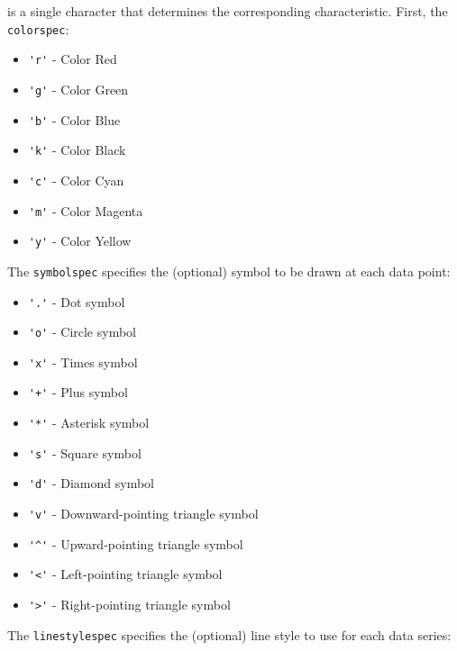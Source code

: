 is a single character that determines the corresponding characteristic.  First, the 
\verb|colorspec|:
\begin{itemize}
\item  \verb|'r'| - Color Red

\item  \verb|'g'| - Color Green

\item  \verb|'b'| - Color Blue

\item  \verb|'k'| - Color Black

\item  \verb|'c'| - Color Cyan

\item  \verb|'m'| - Color Magenta

\item  \verb|'y'| - Color Yellow

\end{itemize}
The \verb|symbolspec| specifies the (optional) symbol to be drawn at each data point:
\begin{itemize}
\item  \verb|'.'| - Dot symbol

\item  \verb|'o'| - Circle symbol

\item  \verb|'x'| - Times symbol

\item  \verb|'+'| - Plus symbol

\item  \verb|'*'| - Asterisk symbol

\item  \verb|'s'| - Square symbol

\item  \verb|'d'| - Diamond symbol

\item  \verb|'v'| - Downward-pointing triangle symbol

\item  \verb|'^'| - Upward-pointing triangle symbol

\item  \verb|'<'| - Left-pointing triangle symbol

\item  \verb|'>'| - Right-pointing triangle symbol

\end{itemize}
The \verb|linestylespec| specifies the (optional) line style to use for each data series:

